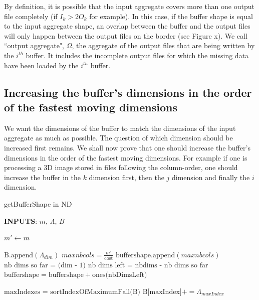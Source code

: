 \documentclass[conference]{IEEEtran}
\begin{document}
By definition, it is possible that the input aggregate covers more than one output file completely (if $I_k > 2O_k$ for example).
In this case, if the buffer shape is equal to the input aggregate shape, an overlap between the buffer and the output files will only happen between the output files on the border (see Figure x). We call ``output aggregate", $\Omega$, the aggregate of the output files that are being written by the $i^{th}$ buffer. It includes the incomplete output files for which the missing data have been loaded by the $i^{th}$ buffer. \\

\subsection{Increasing the buffer's dimensions in the order of the fastest moving dimensions}
We want the dimensions of the buffer to match the dimensions of the input aggregate as much as possible.
The question of which dimension should be increased first remains.
We shall now prove that one should increase the buffer's dimensions in the order of the fastest moving dimensions.
For example if one is processing a 3D image stored in files following the column-order, one should increase the buffer in the $k$ dimension first, then the $j$ dimension and finally the $i$ dimension.

\begin{algorithm}[H]
  \caption{getBufferShape in ND}

  \begin{algorithmic}[1]

    \STATE \textbf{INPUTS}: $m$, $\Lambda$, $B$

    \STATE $m' \gets m$

        \STATE $\textrm{B.append}(\Lambda_{dim})$
      \ENDIF
        \STATE $maxnbcols = \frac{m'}{\textrm{cost}}$
	      \STATE $\textrm{buffershape.append}(maxnbcols)$
      \ENDIF
        \STATE $\textrm{nb dims so far = (dim - 1)}$
        \STATE $\textrm{nb dims left = nbdims - nb dims so far}$
        \STATE $\textrm{buffershape} = \textrm{buffershape} + \textrm{ones(nbDimsLeft)}$
      \ENDIF
    \ENDFOR

    \STATE $\textrm{maxIndexes = sortIndexOfMaximumFall(B)}$ %
        \STATE $\textrm{B[maxIndex]} += \Lambda_{maxIndex}$
      \ENDWHILE
    \ENDFOR

  \end{algorithmic}
  \label{algo:getbuffershape}

\end{algorithm}
\end{document}
